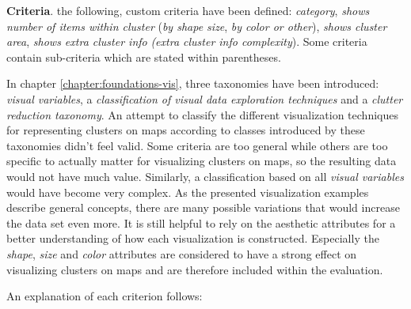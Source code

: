\textbf{Criteria}. the following, custom criteria have been defined: \textit{category}, \textit{shows number of items within cluster} (\textit{by shape size}, \textit{by color or other}), \textit{shows cluster area}, \textit{shows extra cluster info} \textit{(extra cluster info complexity}). Some criteria contain sub-criteria which are stated within parentheses.

In chapter \ref{chapter:foundations-vis}, three taxonomies have been introduced: \textit{visual variables}, a \textit{classification of visual data exploration techniques} and a \textit{clutter reduction taxonomy}. An attempt to classify the different visualization techniques for representing clusters on maps according to classes introduced by these taxonomies didn't feel valid. Some criteria are too general while others are too specific to actually matter for visualizing clusters on maps, so the resulting data would not have much value. Similarly, a classification based on all \textit{visual variables} would have become very complex. As the presented visualization examples describe general concepts, there are many possible variations that would increase the data set even more. It is still helpful to rely on the aesthetic attributes for a better understanding of how each visualization is constructed. Especially the \textit{shape}, \textit{size} and \textit{color} attributes are considered to have a strong effect on visualizing clusters on maps and are therefore included within the evaluation.

An explanation of each criterion follows:

